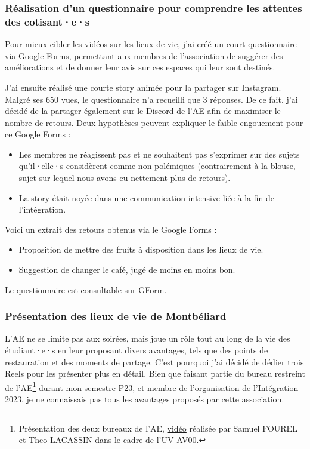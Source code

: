 \subsubsection{Réalisation d'un questionnaire pour comprendre les attentes des cotisant·e·s}

Pour mieux cibler les vidéos sur les lieux de vie, j'ai créé un court questionnaire via Google Forms, permettant aux membres de l'association de suggérer des améliorations et de donner leur avis sur ces espaces qui leur sont destinés.

J'ai ensuite réalisé une courte story animée pour la partager sur Instagram.
Malgré ses 650 vues, le questionnaire n'a recueilli que 3 réponses.
De ce fait, j'ai décidé de la partager également sur le Discord de l'\gls{AE} afin de maximiser le nombre de retours.
Deux hypothèses peuvent expliquer le faible engouement pour ce Google Forms :
\begin{itemize}
    \item Les membres ne réagissent pas et ne souhaitent pas s'exprimer sur des sujets qu'il·elle·s considèrent comme non polémiques (contrairement à la blouse, sujet sur lequel nous avons eu nettement plus de retours).
    \item La story était noyée dans une communication intensive liée à la fin de l'intégration.
\end{itemize}

Voici un extrait des retours obtenus via le Google Forms :
\begin{itemize}
    \item Proposition de mettre des fruits à disposition dans les lieux de vie.
    \item Suggestion de changer le café, jugé de moins en moins bon.
\end{itemize}


Le questionnaire est consultable sur \href{https://docs.google.com/forms/d/e/1FAIpQLSfOkOUDseCfWcLwP2uz_amd-i2v_5OucU92uZAUewR6VN_P_A/viewform?usp=sf_link}{GForm}.

\subsubsection{Présentation des lieux de vie de Montbéliard}\label{subsubsec:montbeliard}

L'\gls{AE} ne se limite pas aux soirées, mais joue un rôle tout au long de la vie des étudiant·e·s en leur proposant divers avantages, tels que des points de restauration et des moments de partage.
C'est pourquoi j'ai décidé de dédier trois Reels pour les présenter plus en détail.
Bien que faisant partie du bureau restreint de l'\gls{AE}\footnote{Présentation des deux bureaux de l'\gls{AE}, \href{https://www.instagram.com/reel/CeT9t0uAxrS/?utm_source=ig_web_copy_link&igshid=MzRlODBiNWFlZA==}{vidéo} réalisée par Samuel FOUREL et Theo LACASSIN dans le cadre de l'UV AV00.} durant mon semestre P23, et membre de l'organisation de l'Intégration 2023, je ne connaissais pas tous les avantages proposés par cette association.

